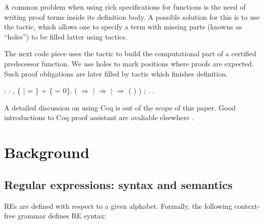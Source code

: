 \coqdocemptyline
A common problem when using rich specifications for functions is the need
of writing proof terms inside its definition body. A possible solution for
this is to use the  tactic, which allows one to specify a term with
missing parts (knowns as ``holes'') to be filled latter using tactics.


The next code piece uses the  tactic to build the computational part
of a certified predecessor function. We use holes to mark positions where proofs are
expected. Such proof obligations are later filled by tactic  which finishes
 definition.
 \begin{coqdoccode}
\coqdocemptyline
\coqdocnoindent
{}  : \coqdockw{\ensuremath{\forall}}  : , \{ \ensuremath{|}  =  \} + \{ = 0\}.\coqdoceol
\coqdocindent{1.00em}
 (  \ensuremath{\Rightarrow}\coqdoceol
\coqdocindent{6.00em}
  \coqdoceol
\coqdocindent{6.00em}
\ensuremath{|}  \ensuremath{\Rightarrow}  \coqdocvar{\_}\coqdoceol
\coqdocindent{6.00em}
\ensuremath{|}   \ensuremath{\Rightarrow}  \coqdocvar{\_} ( \coqdocvar{\_}  \coqdocvar{\_})\coqdoceol
\coqdocindent{6.00em}
) ; .\coqdoceol
\coqdocnoindent
{}.\coqdoceol
\coqdocemptyline
\end{coqdoccode}


A detailed discussion on using Coq is out of the scope of this paper. Good introductions
to Coq proof assistant are avaliable elsewhere \cite{Bertot2010,Chlipala13}.


\section{Background}


\label{section:background}


\subsection{Regular expressions: syntax and semantics}


\label{subsection:resyntaxsemantics}


REs are defined with respect to a given alphabet. Formally, the following context-free
grammar defines RE syntax:

